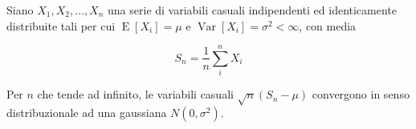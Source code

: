 \documentclass{article}
\begin{document}
Siano $X_1, X_2, \ldots, X_n$ una serie di variabili casuali indipendenti ed
identicamente distribuite tali per cui $\operatorname{E}[X_i] = \mu$ e
$\operatorname{Var}[X_i] = \sigma^2 < \infty$, con media

\begin{equation*}
S_n = \frac{1}{n}\sum_{i}^{n} X_i
\end{equation*}

Per $n$ che tende ad infinito, le variabili casuali
$\sqrt{n}(S_n - \mu)$ convergono in senso distribuzionale
ad una gaussiana $N(0, \sigma^2)$.

\end{document}
